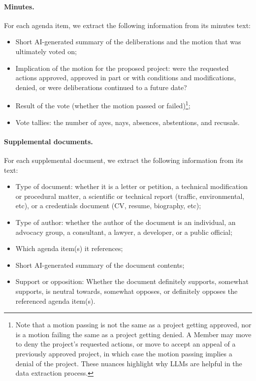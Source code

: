 \paragraph{Minutes.} For each agenda item, we extract the following information from its minutes text:
\begin{itemize}[noitemsep, topsep=0pt]
\item Short AI-generated summary of the deliberations and the motion that was ultimately voted on;
\item Implication of the motion for the proposed project: were the requested actions approved, approved in part or with conditions and modifications, denied, or were deliberations continued to a future date?
\item Result of the vote (whether the motion passed or failed)\footnote{Note that a motion passing is not the same as a project getting approved, nor is a motion failing the same as a project getting denied. A Member may move to deny the project's requested actions, or move to accept an appeal of a previously approved project, in which case the motion passing implies a denial of the project. These nuances highlight why LLMs are helpful in the data extraction process.};
\item Vote tallies: the number of ayes, nays, absences, abstentions, and recusals.
\end{itemize}

\paragraph{Supplemental documents.} For each supplemental document, we extract the following information from its text:
\begin{itemize}[noitemsep, topsep=0pt]
\item Type of document: whether it is a letter or petition, a technical modification or procedural matter, a scientific or technical report (traffic, environmental, etc), or a credentials document (CV, resume, biography, etc); 
\item Type of author: whether the author of the document is an individual, an advocacy group, a consultant, a lawyer, a developer, or a public official;
\item Which agenda item(s) it references;
\item Short AI-generated summary of the document contents;
\item Support or opposition: Whether the document definitely supports, somewhat supports, is neutral towards, somewhat opposes, or definitely opposes the referenced agenda item(s).
\end{itemize}

